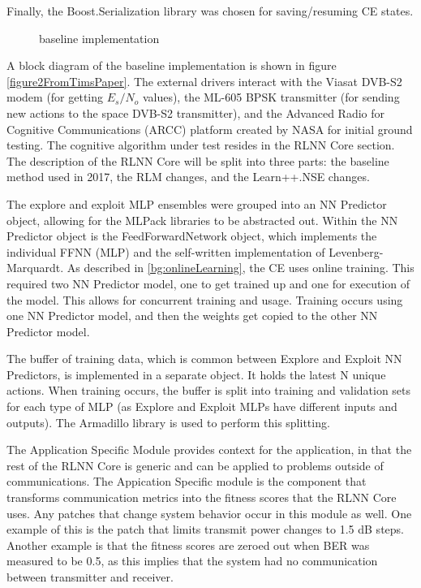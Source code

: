 \par Finally, the Boost.Serialization \cite{cite_boostSerial_lol} library was chosen for saving/resuming CE states. 
\begin{figure}
\caption{baseline implementation}
\end{figure}
\par A block diagram of the baseline implementation is shown in figure \ref{figure2FromTimsPaper}. The external drivers interact with the Viasat DVB-S2 modem (for getting $E_s/N_o$ values), the ML-605 BPSK transmitter (for sending new actions to the space DVB-S2 transmitter), and the Advanced Radio for Cognitive Communications (ARCC) platform created by NASA for initial ground testing. The cognitive algorithm under test resides in the RLNN Core section. The description of the RLNN Core will be split into three parts: the baseline method used in 2017, the RLM changes, and the Learn++.NSE changes.
\par The explore and exploit MLP ensembles were grouped into an NN Predictor object, allowing for the MLPack libraries to be abstracted out. Within the NN Predictor object is the FeedForwardNetwork object, which implements the individual FFNN (MLP) and the self-written implementation of Levenberg-Marquardt. As described in \ref{bg:onlineLearning}, the CE uses online training. This required two NN Predictor model, one to get trained up and one for execution of the model. This allows for concurrent training and usage. Training occurs using one NN Predictor model, and then the weights get copied to the other NN Predictor model. 
\par The buffer of training data, which is common between Explore and Exploit NN Predictors, is implemented in a separate object. It holds the latest N unique actions. When training occurs, the buffer is split into training and validation sets for each type of MLP (as Explore and Exploit MLPs have different inputs and outputs). The Armadillo library is used to perform this splitting.
\par The Application Specific Module provides context for the application, in that the rest of the RLNN Core is generic and can be applied to problems outside of communications. The Appication Specific module is the component that transforms communication metrics into the fitness scores that the RLNN Core uses. Any patches that change system behavior occur in this module as well. One example of this is the patch that limits transmit power changes to 1.5 dB steps. Another example is that the fitness scores are zeroed out when BER was measured to be 0.5, as this implies that the system had no communication between transmitter and receiver. 

